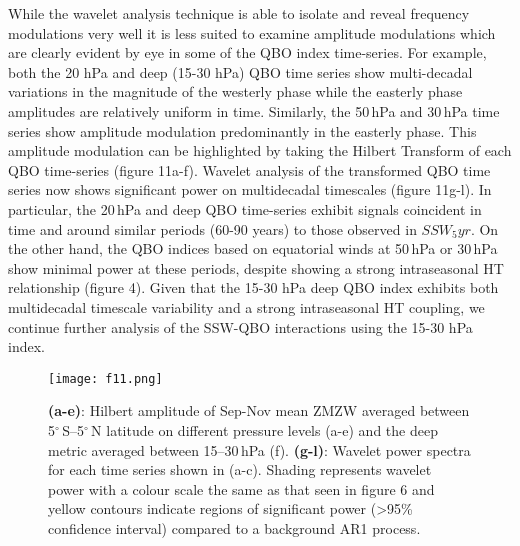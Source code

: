 \documentclass[wcd, manuscript]{copernicus}
\begin{document}

While the wavelet analysis technique is able to isolate and reveal frequency modulations very well it is less suited to examine amplitude modulations which are clearly evident by eye in some of the QBO index time-series. For example, both the 20 hPa and deep (15-30 hPa) QBO time series show multi-decadal variations in the magnitude of the westerly phase while the easterly phase amplitudes are relatively uniform in time. Similarly, the 50\,hPa and 30\,hPa time series show amplitude modulation predominantly in the easterly phase. This amplitude modulation can be highlighted by taking the Hilbert Transform of each QBO time-series (figure 11a-f). Wavelet analysis of the transformed QBO time series now shows significant power on multidecadal timescales (figure 11g-l). In particular, the 20\,hPa and deep QBO time-series exhibit signals coincident in time and around similar periods (60-90 years) to those observed in $SSW_5yr$. On the other hand, the QBO indices based on equatorial winds at 50\,hPa or 30\,hPa show minimal power at these periods, despite showing a strong intraseasonal HT relationship (figure 4). Given that the 15-30 hPa deep QBO  index exhibits  both multidecadal timescale variability and a strong intraseasonal HT coupling, we continue further analysis of the SSW-QBO interactions using the 15-30 hPa index. 

\begin{center}
\begin{figure}[h!]
\texttt{[image: f11.png]}
\caption{\textbf{(a-e)}: Hilbert amplitude of Sep-Nov mean ZMZW averaged between 5$^\circ$\,S--5$^\circ$\,N latitude on different pressure levels (a-e) and the deep metric averaged between 15--30\,hPa (f). \textbf{(g-l)}: Wavelet power spectra for each time series shown in (a-c). Shading represents wavelet power with a colour scale the same as that seen in figure 6 and yellow contours indicate regions of significant power (>95\% confidence interval) compared to a background AR1 process.}
\label{fig1}
\end{figure}
\end{center}
\end{document}
